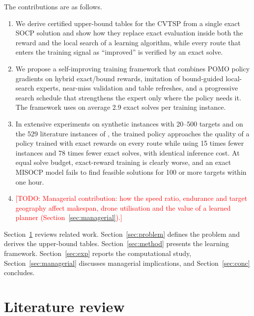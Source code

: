 \documentclass[preprint,review,12pt,authoryear]{elsarticle}
\newcommand{\todo}[1]{\textcolor{red}{[TODO: #1]}}
\begin{document}
The contributions are as follows.
\begin{enumerate}
\item We derive certified upper-bound tables for the CVTSP from a single exact SOCP solution and show how
they replace exact evaluation inside both the reward and the local search of a learning algorithm, while every
route that enters the training signal as ``improved'' is verified by an exact solve.
\item We propose a self-improving training framework that combines POMO policy gradients on hybrid
exact/bound rewards, imitation of bound-guided local-search experts, near-miss validation and table
refreshes, and a progressive search schedule that strengthens the expert only where the policy needs it.
The framework uses on average 2.9 exact solves per training instance.
\item In extensive experiments on synthetic instances with 20--500 targets and on the 529 literature
instances of \citet{li2025exact}, the trained policy approaches the quality of a policy trained with exact
rewards on every route while using 15 times fewer instances and 78 times fewer exact solves, with identical
inference cost. At equal solve budget, exact-reward training is clearly worse, and an exact MISOCP model fails
to find feasible solutions for 100 or more targets within one hour.
\item \todo{Managerial contribution: how the speed ratio, endurance and target geography affect makespan,
drone utilisation and the value of a learned planner (Section~\ref{sec:managerial}).}
\end{enumerate}

Section~\ref{sec:lit} reviews related work. Section~\ref{sec:problem} defines the problem and derives the
upper-bound tables. Section~\ref{sec:method} presents the learning framework. Section~\ref{sec:exp} reports the
computational study, Section~\ref{sec:managerial} discusses managerial implications, and
Section~\ref{sec:conc} concludes.

\section{Literature review}\label{sec:lit}
\end{document}
